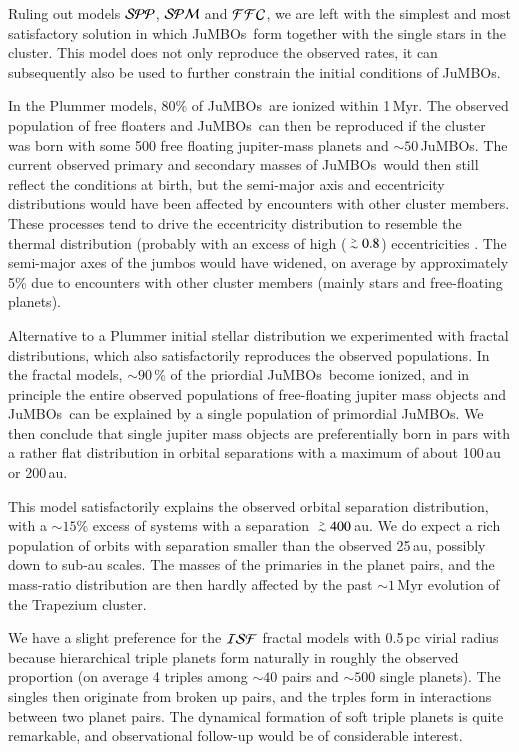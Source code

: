 \documentclass[aa]{lib/aa}
\def\apgt{\ {\raise-.5ex\hbox{$\buildrel>\over\sim$}}\ }
\newcommand{\jumbos}{\mbox{JuMBOs}}
\begin{document}
Ruling out models ${\cal SPP}$, ${\cal SPM}$ and ${\cal FFC}$, we are
left with the simplest and most satisfactory solution in which
\jumbos\, form together with the single stars in the cluster.  This
model does not only reproduce the observed rates, it can subsequently
also be used to further constrain the initial conditions of \jumbos.

In the Plummer models, 80\% of \jumbos\, are ionized within 1\,Myr.
The observed population of free floaters and \jumbos\, can then be
reproduced if the cluster was born with some 500 free floating
jupiter-mass planets and $\sim 50$\,\jumbos. The current observed
primary and secondary masses of \jumbos\, would then still reflect the
conditions at birth, but the semi-major axis and eccentricity
distributions would have been affected by encounters with other
cluster members. These processes tend to drive the eccentricity
distribution to resemble the thermal distribution (probably with an
excess of high ($\apgt 0.8$) eccentricities \citep{SPZMcM2000}. The
semi-major axes of the jumbos would have widened, on average by
approximately 5\% due to encounters with other cluster members
(mainly stars and free-floating planets).

Alternative to a Plummer initial stellar distribution we experimented
with fractal distributions, which also satisfactorily reproduces the
observed populations. In the fractal models, $\sim 90$\,\% of the
priordial \jumbos\, become ionized, and in principle the entire
observed populations of free-floating jupiter mass objects and
\jumbos\, can be explained by a single population of primordial
\jumbos. We then conclude that single jupiter mass objects are
preferentially born in pars with a rather flat distribution in orbital
separations with a maximum of about 100\,au or 200\,au.

This model satisfactorily explains the observed orbital separation
distribution, with a $\sim 15$\% excess of systems with a separation
$\apgt 400$\,au. We do expect a rich population of orbits with
separation smaller than the observed 25\,au, possibly down to sub-au
scales.  The masses of the primaries in the planet pairs, and the
mass-ratio distribution are then hardly affected by the past $\sim
1$\,Myr evolution of the Trapezium cluster.

We have a slight preference for the ${\cal ISF}$ fractal models with
0.5\,pc virial radius because hierarchical triple planets form
naturally in roughly the observed proportion (on average 4 triples
among $\sim 40$ pairs and $\sim 500$ single planets). The singles then
originate from broken up pairs, and the trples form in interactions
between two planet pairs. The dynamical formation of soft triple
planets is quite remarkable, and observational follow-up would be of
considerable interest.
\end{document}
